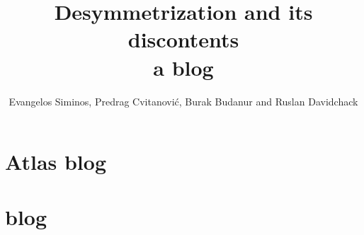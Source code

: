 \documentclass[10pt,openany]{book}
\title{Desymmetrization and its discontents
       \\ \Huge a blog}
\author{Evangelos Siminos,
        Predrag Cvitanovi\'{c}, Burak Budanur and
        Ruslan Davidchack}
\begin{document}
\maketitle

\tableofcontents





    \newpage






    \chapter{Atlas  blog}
    \label{chap:atlas}


    \chapter{{\twoMode} blog}
    \label{chap:2modes}







\newpage
% 
% 





\end{document}
